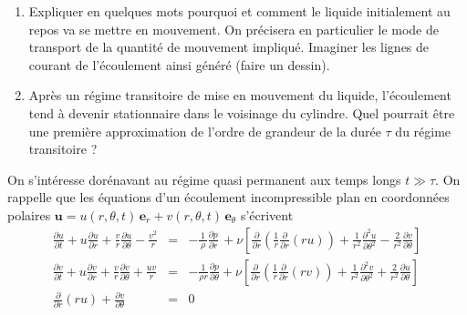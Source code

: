 \begin{enumerate}
\setcounter{enumi}{0}
\item
Expliquer en quelques mots pourquoi et comment le liquide initialement
au repos va se mettre en mouvement.
On précisera en particulier le mode de transport de la quantité de mouvement
impliqué. 
Imaginer les lignes de courant de l'\'ecoulement ainsi g\'en\'er\'e
(faire un dessin).
\item
Apr\`es un r\'egime transitoire de mise en mouvement du liquide,
l'\'ecoulement tend \`a devenir stationnaire dans le voisinage du cylindre.
Quel pourrait \^etre une premi\`ere approximation de l'ordre de grandeur
de la dur\'ee $\tau$ du r\'egime transitoire ? 
\end{enumerate}
\noindent
On s'int\'eresse dor\'enavant au r\'egime quasi permanent aux temps longs $t \gg \tau$.
On rappelle que les \'equations d'un \'ecoulement incompressible plan
en coordonn\'ees polaires 
$\mathbf{u} = u(r, \theta, t) \, \mathbf{e}_r + v(r, \theta, t) \, \mathbf{e}_\theta$
s'\'ecrivent
\begin{eqnarray}
              \frac{\partial u}{\partial t}
+           u \frac{\partial u}{\partial r}
+ \frac{v}{r} \frac{\partial u}{\partial \theta} - \frac{v^2}{r}
& = &
- \frac{1}{\,\rho\,} \frac{\partial p}{\partial r} \,
+ \nu \left [ 	
\frac{\partial}{\partial r} \left (\frac{1}{r} \frac{\partial}{\partial r} (ru)  \right )  
+ \frac{1}{r^2} \frac{\partial^2 u}{\partial \theta^2} 
- \frac{2}{r^2} \frac{\partial v}{\partial \theta}
\right ]
\\
              \frac{\partial v}{\partial t}
+           u \frac{\partial v}{\partial r}
+ \frac{v}{r} \frac{\partial v}{\partial \theta} + \frac{uv}{r}
& = &
- \frac{1}{\rho r} \frac{\partial p}{\partial \theta}
+ \nu \left [ 	
\frac{\partial}{\partial r} \left (\frac{1}{r} \frac{\partial}{\partial r} (rv)  \right )  
+ \frac{1}{r^2} \frac{\partial^2 v}{\partial \theta^2} 
+ \frac{2}{r^2} \frac{\partial u}{\partial \theta}
\right ]
\\
\frac{\partial}{\partial r}(ru) + \frac{\partial v}{\partial \theta} & = & 0
\end{eqnarray}
            

